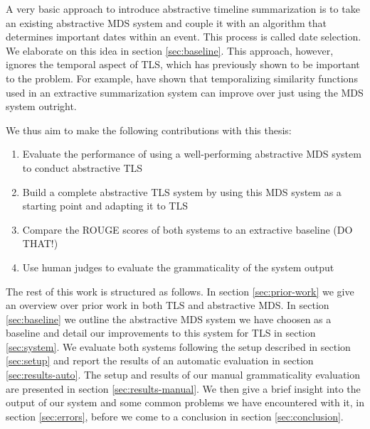 \documentclass[a4paper,BCOR=10mm]{report}
\numberwithin{lemma}{chapter}
\numberwithin{definition}{chapter}
\begin{document}

A very basic approach to introduce abstractive timeline summarization is to take an existing abstractive MDS system and couple it with an algorithm that determines important dates within an event. This process is called date selection. We elaborate on this idea in section \ref{sec:baseline}. This approach, however, ignores the temporal aspect of TLS, which has previously shown to be important to the problem. For example, \citet{markert} have shown that temporalizing similarity functions used in an extractive summarization system can improve over just using the MDS system outright.

We thus aim to make the following contributions with this thesis:

\begin{enumerate}
\item{Evaluate the performance of using a well-performing abstractive MDS system to conduct abstractive TLS}
\item{Build a complete abstractive TLS system by using this MDS system as a starting point and adapting it to TLS}
\item{Compare the ROUGE scores of both systems to an extractive baseline (DO THAT!)}
\item{Use human judges to evaluate the grammaticality of the system output}
\end{enumerate}

The rest of this work is structured as follows.
In section \ref{sec:prior-work} we give an overview over prior work in both TLS and abstractive MDS.
In section \ref{sec:baseline} we outline the abstractive MDS system we have choosen as a baseline and detail our improvements to this system for TLS in section \ref{sec:system}.
We evaluate both systems following the setup described in 
section \ref{sec:setup} and report the results of an automatic evaluation in section \ref{sec:results-auto}.
The setup and results of our manual grammaticality evaluation are presented in section \ref{sec:results-manual}.
We then give a brief insight into the output of our system and some common problems we have encountered with it, in section \ref{sec:errors}, before we come to a conclusion in section \ref{sec:conclusion}.
\end{document}
